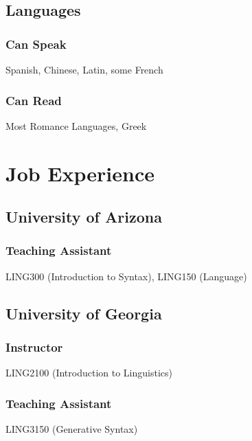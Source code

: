 \documentclass{article}
\begin{document}
\subsection{Languages}
\subsubsection{Can Speak} 
Spanish, Chinese, Latin, some French
\subsubsection{Can Read}
Most Romance Languages, Greek
\section{Job Experience}
\subsection{University of Arizona}
\subsubsection{Teaching Assistant} LING300 (Introduction to Syntax), LING150 (Language)
\subsection{University of Georgia}
\subsubsection{Instructor} LING2100 (Introduction to Linguistics)
\subsubsection{Teaching Assistant} LING3150 (Generative Syntax)
\end{document}
